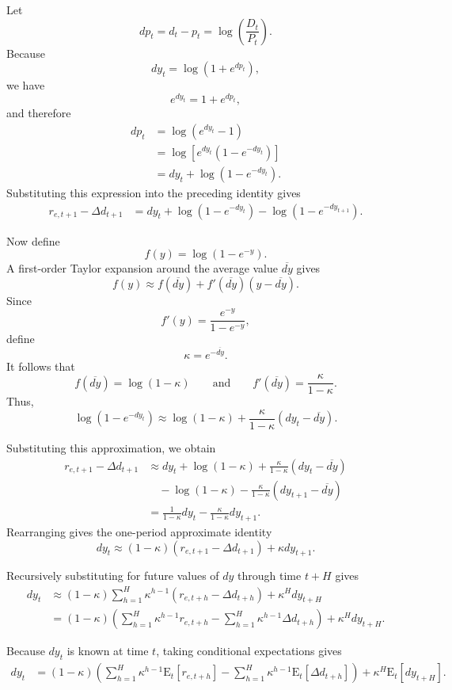 \documentclass{article}
\begin{document}
Let
\[
dp_t=d_t-p_t=\log\left(\frac{D_t}{P_t}\right).
\]
Because
\[
dy_t=\log(1+e^{dp_t}),
\]
we have
\[
e^{dy_t}=1+e^{dp_t},
\]
and therefore
\begin{align*}
dp_t
&=\log(e^{dy_t}-1)\\
&=\log\left[e^{dy_t}(1-e^{-dy_t})\right]\\
&=dy_t+\log(1-e^{-dy_t}).
\end{align*}
Substituting this expression into the preceding identity gives
\begin{align*}
r_{e,t+1}-\Delta d_{t+1}
&=
dy_t+\log(1-e^{-dy_t})
-\log(1-e^{-dy_{t+1}}).
\end{align*}

Now define
\[
f(y)=\log(1-e^{-y}).
\]
A first-order Taylor expansion around the average value
\(\overline{dy}\) gives
\[
f(y)
\approx
f(\overline{dy})
+
f'(\overline{dy})(y-\overline{dy}).
\]
Since
\[
f'(y)=\frac{e^{-y}}{1-e^{-y}},
\]
define
\[
\kappa=e^{-\overline{dy}}.
\]
It follows that
\[
f(\overline{dy})=\log(1-\kappa)
\qquad\text{and}\qquad
f'(\overline{dy})=\frac{\kappa}{1-\kappa}.
\]
Thus,
\[
\log(1-e^{-dy_t})
\approx
\log(1-\kappa)
+
\frac{\kappa}{1-\kappa}
(dy_t-\overline{dy}).
\]

Substituting this approximation, we obtain
\begin{align*}
r_{e,t+1}-\Delta d_{t+1}
&\approx
dy_t
+
\log(1-\kappa)
+
\frac{\kappa}{1-\kappa}(dy_t-\overline{dy})\\
&\quad
-
\log(1-\kappa)
-
\frac{\kappa}{1-\kappa}(dy_{t+1}-\overline{dy})\\
&=
\frac{1}{1-\kappa}dy_t
-
\frac{\kappa}{1-\kappa}dy_{t+1}.
\end{align*}
Rearranging gives the one-period approximate identity
\[
dy_t
\approx
(1-\kappa)
\left(r_{e,t+1}-\Delta d_{t+1}\right)
+
\kappa dy_{t+1}.
\]

Recursively substituting for future values of \(dy\) through
time \(t+H\) gives
\begin{align}
dy_t
&\approx
(1-\kappa)
\sum_{h=1}^{H}
\kappa^{h-1}
\left(r_{e,t+h}-\Delta d_{t+h}\right)
+
\kappa^Hdy_{t+H}
\nonumber\\
&=
(1-\kappa)
\left(
\sum_{h=1}^{H}\kappa^{h-1}r_{e,t+h}
-
\sum_{h=1}^{H}\kappa^{h-1}\Delta d_{t+h}
\right)
+
\kappa^Hdy_{t+H}.
\tag{1.7}
\end{align}

Because \(dy_t\) is known at time \(t\), taking conditional
expectations gives
\begin{align}
dy_t
&=
(1-\kappa)
\left(
\sum_{h=1}^{H}
\kappa^{h-1}\mathrm{E}_t[r_{e,t+h}]
-
\sum_{h=1}^{H}
\kappa^{h-1}\mathrm{E}_t[\Delta d_{t+h}]
\right)
+
\kappa^H\mathrm{E}_t[dy_{t+H}].
\tag{1.8}
\end{align}
\end{document}
